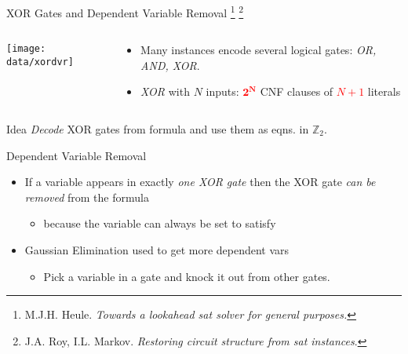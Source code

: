 \documentclass[mathserif,serif]{beamer}
\begin{document}
\begin{frame}{XOR Gates and Dependent Variable Removal
\footnote{M.J.H. Heule. \emph{Towards a lookahead sat solver for general purposes.}}
\footnote{J.A. Roy, I.L. Markov. \emph{Restoring circuit structure from sat instances}.}}

  \begin{columns}[t]
    \begin{column}[T]{0.3\textwidth}
      \texttt{[image: data/xordvr]}
    \end{column}

    \begin{column}[T]{0.8\textwidth}
      \begin{itemize}
        \item Many instances encode several logical gates: \emph{OR, AND, XOR}.
        \item \emph{XOR} with $N$ inputs: \textcolor{red}{$\mathbf{2^{N}}$} CNF
        clauses of \textcolor{red}{$N + 1$} literals
      \end{itemize}
    \end{column}
  \end{columns}

  \begin{block}{Idea}
    \emph{Decode} XOR gates from formula and use them as eqns. in $\mathbb{Z}_2$.
  \end{block}

  \begin{block}{Dependent Variable Removal}
    \begin{itemize}
      \item If a variable appears in exactly \emph{one XOR gate} then the XOR gate
      \emph{can be removed} from the formula
        \begin{itemize}
          \item because the variable can always be set to satisfy
        \end{itemize}
      \item Gaussian Elimination used to get more dependent vars
      \begin{itemize}
        \item Pick a variable in a gate and knock it out from other gates.
      \end{itemize}
    \end{itemize}
  \end{block}
\end{frame}
\end{document}
